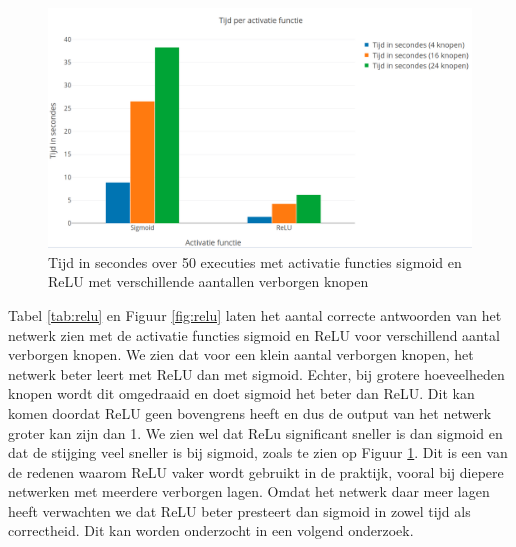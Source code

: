 \clearpage
\begin{figure}[ht!]
    \centering
    \includegraphics[scale=0.3]{graphs/time.png}
    \caption{Tijd in secondes over 50 executies met activatie functies sigmoid en ReLU met verschillende aantallen verborgen knopen}
    \label{fig:relutime}
\end{figure}

Tabel \ref{tab:relu} en Figuur \ref{fig:relu} laten het aantal correcte antwoorden van het netwerk zien met de activatie functies sigmoid en ReLU voor verschillend aantal verborgen knopen. We zien dat voor een klein aantal verborgen knopen, het netwerk beter leert met ReLU dan met sigmoid. Echter, bij grotere hoeveelheden knopen wordt dit omgedraaid en doet sigmoid het beter dan ReLU. Dit kan komen doordat ReLU geen bovengrens heeft en dus de output van het netwerk groter kan zijn dan 1. We zien wel dat ReLu significant sneller is dan sigmoid en dat de stijging veel sneller is bij sigmoid, zoals te zien op Figuur \ref{fig:relutime}.
Dit is een van de redenen waarom ReLU vaker wordt gebruikt in de praktijk, vooral bij diepere netwerken met meerdere verborgen lagen. Omdat het netwerk daar meer lagen heeft verwachten we dat ReLU beter presteert dan sigmoid in zowel tijd als correctheid. Dit kan worden onderzocht in een volgend onderzoek.
